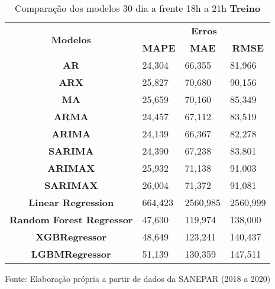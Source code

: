 	\begin{table}[H]
	\centering
	\caption{Comparação dos modelos 30 dia a frente 18h a 21h \textbf{Treino} }\label{tb:30-18trn}
	\begin{tabular}{@{}clll@{}}
		\toprule
		\multirow{2}{*}{\textbf{Modelos}} & \multicolumn{3}{c}{\textbf{Erros}}                                                                       \\ \cmidrule(l){2-4} 
		& \multicolumn{1}{c}{\textbf{MAPE}} & \multicolumn{1}{c}{\textbf{MAE}} & \multicolumn{1}{c}{\textbf{RMSE}} \\ \hline
\textbf{AR}                       & 24,304                            & 66,355                           & 81,966                            \\
\textbf{ARX}                      & 25,827                            & 70,680                           & 90,156                            \\
\textbf{MA}                       & 25,659                            & 70,160                           & 85,349                            \\
\textbf{ARMA}                     & 24,457                            & 67,112                           & 83,519                            \\
\textbf{ARIMA}                    & 24,139                            & 66,367                           & 82,278                            \\
\textbf{SARIMA}                   & 24,390                            & 67,238                           & 83,801                            \\
\textbf{ARIMAX}                   & 25,932                            & 71,138                           & 91,003                            \\
\textbf{SARIMAX}                  & 26,004                            & 71,372                           & 91,081                            \\
\textbf{Linear Regression}        & 664,423                           & 2560,985                         & 2560,999                          \\
\textbf{Random Forest Regressor}  & 47,630                            & 119,974                          & 138,000                           \\
\textbf{XGBRegressor}             & 48,649                            & 123,241                          & 140,437                           \\
\textbf{LGBMRegressor}            & 51,139                            & 130,359                          & 147,511                           \\ \bottomrule
	\end{tabular}

Fonte: Elaboração própria a partir de dados da SANEPAR (2018 a 2020)
\end{table}

